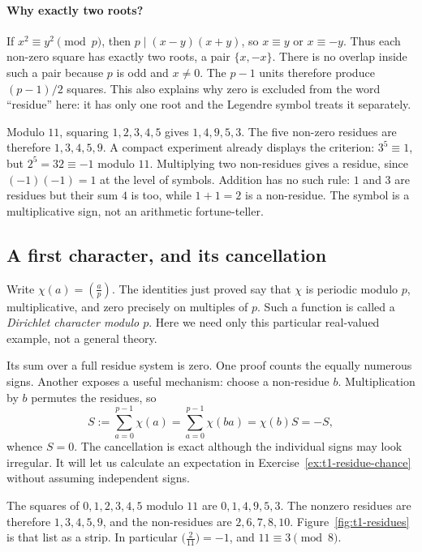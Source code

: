 \paragraph{Why exactly two roots?}
If $x^2\equiv y^2\pmod p$, then $p\mid(x-y)(x+y)$, so $x\equiv y$ or
$x\equiv-y$. Thus each non-zero square has exactly two roots, a pair
$\{x,-x\}$. There is no overlap inside such a pair because $p$ is odd and
$x\ne0$. The $p-1$ units therefore produce $(p-1)/2$ squares. This also
explains why zero is excluded from the word ``residue'' here: it has only one
root and the Legendre symbol treats it separately.

Modulo $11$, squaring $1,2,3,4,5$ gives $1,4,9,5,3$. The five non-zero
residues are therefore $1,3,4,5,9$. A compact experiment already displays the
criterion: $3^5\equiv1$, but $2^5=32\equiv-1$ modulo $11$.
Multiplying two non-residues gives a residue, since $(-1)(-1)=1$ at the level
of symbols. Addition has no such rule: $1$ and $3$ are residues but their sum
$4$ is too, while $1+1=2$ is a non-residue. The symbol is a multiplicative
sign, not an arithmetic fortune-teller.

\subsection*{A first character, and its cancellation}
Write $\chi(a)=\left(\frac ap\right)$. The identities just proved say that
$\chi$ is periodic modulo $p$, multiplicative, and zero precisely on multiples
of $p$. Such a function is called a \emph{Dirichlet character modulo $p$}.
Here we need only this particular real-valued example, not a general theory.

Its sum over a full residue system is zero. One proof counts the equally
numerous signs. Another exposes a useful mechanism: choose a non-residue $b$.
Multiplication by $b$ permutes the residues, so
\[
S:=\sum_{a=0}^{p-1}\chi(a)
=\sum_{a=0}^{p-1}\chi(ba)=\chi(b)S=-S,
\]
whence $S=0$. The cancellation is exact although the individual signs may
look irregular. It will let us calculate an expectation in
Exercise~\ref{ex:t1-residue-chance} without assuming independent signs.

\begin{examplex}
The squares of $0,1,2,3,4,5$ modulo $11$ are $0,1,4,9,5,3$.
The nonzero residues are therefore $1,3,4,5,9$, and the non-residues are $2,6,7,8,10$.
Figure~\ref{fig:t1-residues} is that list as a strip. In particular $\bigl(\frac{2}{11}\bigr)=-1$, and $11\equiv 3\pmod 8$.
\end{examplex}


